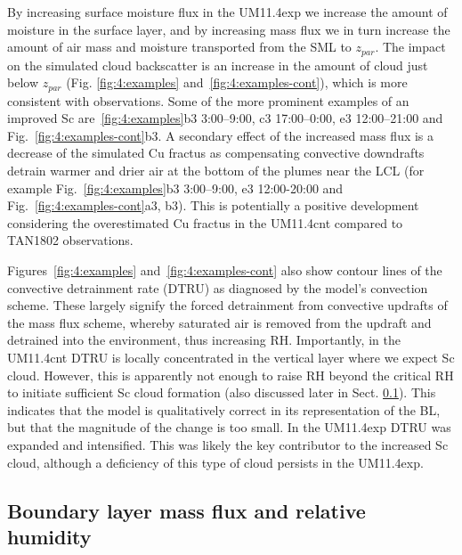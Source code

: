 By increasing surface moisture flux in the UM11.4exp we increase
the amount of moisture in the surface layer, and by increasing mass
flux we in turn increase the amount of air mass and moisture transported
from the SML to $z_{par}$. The impact on the simulated
cloud backscatter is an increase in the amount of cloud just below $z_{par}$ (Fig.
\ref{fig:4:examples} and~\ref{fig:4:examples-cont}),
which is more consistent with observations. Some of the more
prominent examples of an improved Sc are~\ref{fig:4:examples}b3 3:00--9:00, c3 17:00--0:00,
e3 12:00--21:00 and Fig.~\ref{fig:4:examples-cont}b3. A secondary effect
of the increased mass flux is a decrease of the simulated Cu fractus as
compensating convective downdrafts detrain warmer and drier air at the bottom
of the plumes near the LCL (for example Fig.~\ref{fig:4:examples}b3 3:00--9:00, e3 12:00-20:00
and Fig.~\ref{fig:4:examples-cont}a3, b3). This is potentially a positive
development considering the overestimated Cu fractus in the UM11.4cnt compared
to TAN1802 observations.

Figures~\ref{fig:4:examples} and~\ref{fig:4:examples-cont} also show contour lines
of the convective detrainment rate (DTRU) as diagnosed by the model's
convection scheme. These largely signify the forced detrainment from convective
updrafts of the mass flux scheme, whereby saturated air is removed from the
updraft and detrained into the environment, thus increasing RH.
Importantly, in the UM11.4cnt DTRU is locally concentrated in the vertical layer
where we expect Sc cloud. However, this is apparently not enough to raise RH beyond the critical RH to initiate sufficient Sc cloud formation (also discussed later in Sect.
\ref{sec:4:bl-mass-flux-and-rh}).
This indicates that the model is qualitatively correct in its representation
of the BL, but that the magnitude of the change is too small. In the UM11.4exp DTRU was expanded and intensified.
This was likely the key contributor to the increased
Sc cloud, although a deficiency of this type of cloud persists in the
UM11.4exp.


\subsection{Boundary layer mass flux and relative humidity}
\label{sec:4:bl-mass-flux-and-rh}

